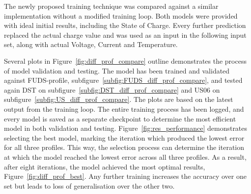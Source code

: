 The newly proposed training technique was compared against a similar implementation without a modified training loop.
Both models were provided with ideal initial results, including the State of Charge.
Every further prediction replaced the actual charge value and was used as an input in the following input set, along with actual Voltage, Current and Temperature.
    
    Several plots in \mbox{Figure~\ref{fig:diff_prof_compare}} outline demonstrates the process of model validation and testing.
    The model has been trained and validated against FUDS-profile, \mbox{subfigure~\ref{subfig:FUDS_diff_prof_compare}}, and tested again DST on \mbox{subfigure~\ref{subfig:DST_diff_prof_compare}} and US06 on \mbox{subfigure~\ref{subfig:US_diff_prof_compare}}.
    The plots are based on the latest output from the training loop.
    The entire training process has been logged, and every model is saved as a separate checkpoint to determine the most efficient model in both validation and testing.
    \mbox{Figure~\ref{fig:res_performance}} demonstrates selecting the best model, marking the iteration which produced the lowest error for all three profiles.
    This way, the selection process can determine the iteration at which the model reached the lowest error across all three profiles. 
    As a result, after eight iterations, the model achieved the most optimal results, \mbox{Figure~\ref{fig:diff_prof_best}}.
    Any further training increases the accuracy over one set but leads to loss of generalisation over the other two.

